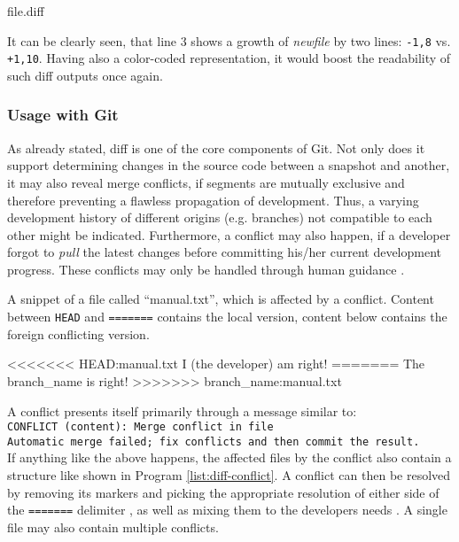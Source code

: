 \begin{program}
  \caption{file.diff}
  \label{list:diff-explanation}

\end{program}

It can be clearly seen, that line 3 shows a growth of \emph{newfile} by two lines: \texttt{-1,8} vs. \texttt{+1,10}. Having also a color-coded representation, it would boost the readability of such diff outputs once again.


\subsubsection{Usage with Git}
As already stated, diff is one of the core components of Git. Not only does it support determining changes in the source code between a snapshot and another, it may also reveal merge conflicts, if segments are mutually exclusive and therefore preventing a flawless propagation of development. Thus, a varying development history of different origins (e.g. branches) not compatible to each other might be indicated. Furthermore, a conflict may also happen, if a developer forgot to \emph{pull} the latest changes before committing his/her current development progress. These conflicts may only be handled through human guidance \cite[124]{loeliger2012version}.

\begin{program}
  \caption{A snippet of a file called ``manual.txt'', which is affected by a conflict. Content between \texttt{HEAD} and \texttt{=======} contains the local version, content below contains the foreign conflicting version.}
  \label{list:diff-conflict}
\begin{GenericCode}
<<<<<<< HEAD:manual.txt
I (the developer) am right!
=======
The branch_name is right!
>>>>>>> branch_name:manual.txt
\end{GenericCode}
\end{program}

A conflict presents itself primarily through a message similar to:\\
\texttt{CONFLICT (content): Merge conflict in file\\
Automatic merge failed; fix conflicts and then commit the result.}\\
If anything like the above happens, the affected files by the conflict also contain a structure like shown in Program \ref{list:diff-conflict}. A conflict can then be resolved by removing its markers and picking the appropriate resolution of either side of the \texttt{=======} delimiter \cite{GitConflicts}, as well as mixing them to the developers needs \cite[126]{loeliger2012version}. A single file may also contain multiple conflicts.

